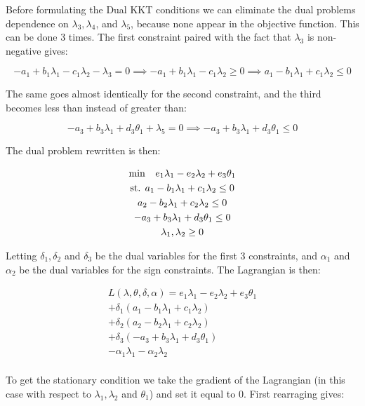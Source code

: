 \documentclass{article}
\begin{document}
\newpage

Before formulating the Dual KKT conditions we can eliminate the dual problems dependence on $\lambda_3, \lambda_4$, and $\lambda_5$, because none appear in the objective function. This can be done 3 times. The first constraint paired with the fact that $\lambda_3$ is non-negative gives:

$$ -a_1 + b_1\lambda_1 - c_1\lambda_2 - \lambda_3 = 0 \implies  -a_1 + b_1\lambda_1 - c_1\lambda_2 \geq 0 \implies  a_1 - b_1\lambda_1 + c_1\lambda_2 \leq 0$$

The same goes almost identically for the second constraint, and the third becomes less than instead of greater than:

$$-a_3 + b_3\lambda_1 + d_3\theta_1 + \lambda_5 = 0 \implies -a_3 + b_3\lambda_1 + d_3\theta_1 \leq 0$$

The dual problem rewritten is then:

\begin{gather*}
  \min \hspace{3mm} e_1\lambda_1 - e_2\lambda_2 + e_3\theta_1\\
  \text{st.  } a_1 - b_1\lambda_1 + c_1\lambda_2 \leq 0 \\
  a_2 - b_2\lambda_1 + c_2\lambda_2 \leq 0 \\
  -a_3 + b_3\lambda_1 + d_3\theta_1 \leq 0 \\
  \lambda_1, \lambda_2 \geq 0 \\
\end{gather*}

Letting $\delta_1, \delta_2$ and $\delta_3$ be the dual variables for the first 3 constraints, and $\alpha_1$ and $\alpha_2$ be the dual variables for the sign constraints. The Lagrangian is then:

\begin{gather*}
  L(\lambda, \theta, \delta, \alpha) =  e_1\lambda_1 - e_2\lambda_2 + e_3\theta_1\\
  + \delta_1 (a_1 - b_1\lambda_1 + c_1\lambda_2) \\
  + \delta_2 (a_2 - b_2\lambda_1 + c_2\lambda_2) \\
  + \delta_3 (-a_3 + b_3\lambda_1 + d_3\theta_1) \\
  - \alpha_1 \lambda_1 - \alpha_2 \lambda_2 \\
\end{gather*}  


To get the stationary condition we take the gradient of the Lagrangian (in this case with respect to $\lambda_1, \lambda_2$ and $\theta_1$) and set it equal to 0. First rearraging gives:
\end{document}
